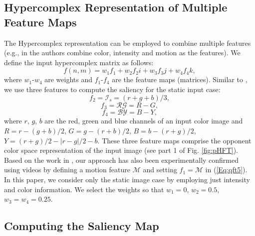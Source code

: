 \documentclass[10pt,journal,cspaper,compsoc]{IEEEtran}
\begin{document}
\subsection{Hypercomplex Representation of Multiple Feature Maps}
The Hypercomplex representation can be employed to combine multiple features (e.g., in \cite{guo2010multiresolution} the authors combine color, intensity and motion as the features). We define the input hypercomplex matrix as follows:
\begin{equation}
f(n,m)=w_{1}f_{1}+w_{2}f_{2}i+w_{3}f_{3}j+w_{4}f_{4}k,
\label{Eq:qft5}
\end{equation}
where ${w_{1}\text{-}w_{4}}$  are weights and ${f_{1}\text{-}f_{4}}$  are the feature maps (matrices). Similar to \cite{Itti_etal98pami}, we use three features to compute the saliency for the static input case:
\begin{equation}
f_{2}=\mathcal {I}_{s}=(r+g+b)/3,
\label{Eq:fm1}
\end{equation}
\begin{equation}
\label{Eq:fm2}
f_{3}=\mathcal {RG}=R-G,
\end{equation}
\begin{equation}
\label{Eq:fm3}
f_{4}=\mathcal {BY}=B-Y,
\end{equation}
where $r$, $g$, $b$ are the red, green and blue channels of an input color image and $R=r-(g+b)/2$, $G=g-(r+b)/2$, $B=b-(r+g)/2$, $Y=(r+g)/2-|r-g|/2-b$.
These three feature maps comprise the opponent color space representation of the input image (see part 1 of Fig. \ref{fig:pHFT}). Based on the work in \cite{guo2010multiresolution}, our approach has also been experimentally confirmed using videos by defining a motion feature $\mathcal M$ and setting $f_{1}=\mathcal M$  in (\ref{Eq:qft5}). In this paper, we consider only the static image case by employing just intensity and color information. We select the weights so that $w_{1}=0$,  $w_{2}=0.5$,  $w_{3}=w_{4}=0.25$.

\subsection{Computing the Saliency Map}
\end{document}
